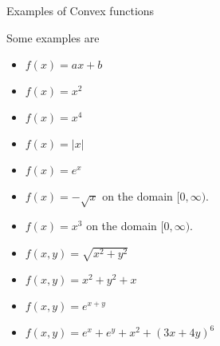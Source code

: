 \footnotemark




\begin{example}{Examples of Convex functions}{}

Some examples are 

\begin{itemize}
\item $f(x) = ax + b$
\item $f(x) = x^2$
\item $f(x) = x^4$
\item $f(x) = |x|$
\item $f(x) = e^x$
\item $f(x) = - \sqrt{x}$ on the domain $[0,\infty)$.
\item $f(x) = x^3$ on the domain $[0,\infty)$.
\item $f(x,y) = 
\sqrt{x^2 + y^2}$
\item $f(x,y) = x^2 + y^2 + x$
\item $ f(x,y) = e^{x+y}$
\item $f(x,y) = e^{x} + e^{y} + x^2+  (3x + 4y)^6$
\end{itemize}

\end{example}






